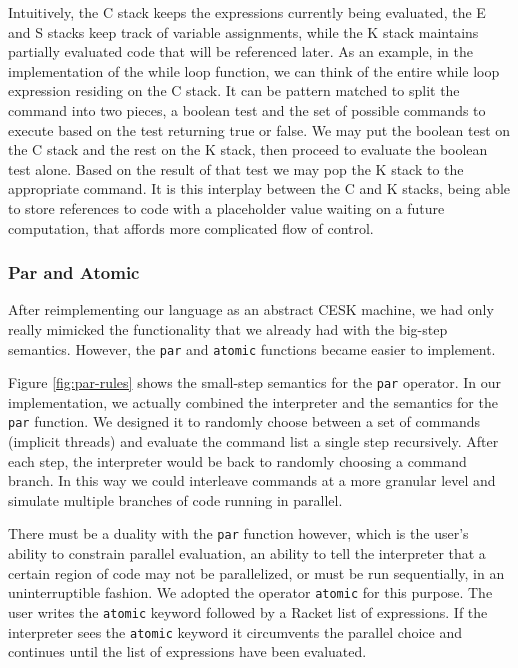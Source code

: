 Intuitively, the C stack keeps the expressions currently being evaluated, the E and S stacks keep track of variable assignments, while the K stack maintains partially evaluated code that will be referenced later.  As an example, in the implementation of the while loop function, we can think of the entire while loop expression residing on the C stack.  It can be pattern matched to split the command into two pieces, a boolean test and the set of possible commands to execute based on the test returning true or false.  We may put the boolean test on the C stack and the rest on the K stack, then proceed to evaluate the boolean test alone.  Based on the result of that test we may pop the K stack to the appropriate command.  It is this interplay between the C and K stacks, being able to store references to code with a placeholder value waiting on a future computation, that affords more complicated flow of control.  

\subsubsection{Par and Atomic}
After reimplementing our language as an abstract CESK machine, we had only really mimicked the functionality that we already had with the big-step semantics.  However, the \texttt{par} and \texttt{atomic} functions became easier to implement.

Figure \ref{fig:par-rules} shows the small-step semantics for the \texttt{par} operator. In our implementation, we actually combined the interpreter and the semantics for the \texttt{par} function.  We designed it to randomly choose between a set of commands (implicit threads) and evaluate the command list a single step recursively.  After each step, the interpreter would be back to randomly choosing a command branch.  In this way we could interleave commands at a more granular level and simulate multiple branches of code running in parallel.

There must be a duality with the \texttt{par} function however, which is the user's ability to constrain parallel evaluation, an ability to tell the interpreter that a certain region of code may not be parallelized, or must be run sequentially, in an uninterruptible fashion.  We adopted the operator \texttt{atomic} for this purpose.  The user writes the \texttt{atomic} keyword followed by a Racket list of expressions.  If the interpreter sees the \texttt{atomic} keyword it circumvents the parallel choice and continues until the list of expressions have been evaluated.

